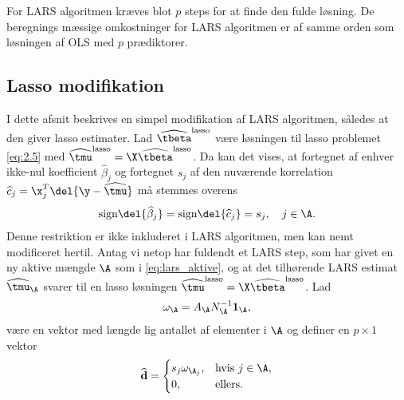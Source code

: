 For LARS algoritmen kræves blot \(p\) steps for at finde den fulde løsning.
De beregnings mæssige omkostninger for LARS algoritmen er af samme orden som løsningen af OLS med \(p\) prædiktorer.


\subsection{Lasso modifikation} \label{subsec:lasso_modifikation}
I dette afsnit beskrives en simpel modifikation af LARS algoritmen, således at den giver lasso estimater.
Lad \(\widehat{\tbeta}^\text{lasso}\) være løsningen til lasso problemet \eqref{eq:2.5} med \(\widehat{\tmu}^\text{lasso} = \X \widehat{\tbeta}^\text{lasso}\).
Da kan det vises, at fortegnet af enhver ikke-nul koefficient \(\widehat{\beta}_j\) og fortegnet \(s_j\) af den nuværende korrelation \(\widehat{c}_j = \x_j^T \del{\y - \widehat{\tmu}}\) må stemmes overens
\begin{align}
\text{sign} \del{\widehat{\beta}_j } = \text{sign} \del{\widehat{c}_j } = s_j, \quad j \in \A. \label{eq:lars_3.1}
\end{align}
%
%
Denne restriktion er ikke inkluderet i LARS algoritmen, men kan nemt modificeret hertil. 
Antag vi netop har fuldendt et LARS step, som har givet en ny aktive mængde \(\A\) som i \eqref{eq:lars_aktive}, og at det tilhørende LARS estimat \(\widehat{\tmu}_\A\) svarer til en lasso løsningen \(\widehat{\tmu}^\text{lasso} = \X \widehat{\tbeta}^\text{lasso}\).
Lad
\begin{align*}
\omega_\A = A_\A N_\A^{-1} \mathbf{1}_\A,
\end{align*}
være en vektor med længde lig antallet af elementer i \(\A\) og definer en \(p \times 1\) vektor
\begin{align*}
\widehat{\mathbf{d}} = \begin{cases}
s_j \omega_{\A_j}, &\text{hvis } j \in \A, \\
0, & \text{ellers}.
\end{cases}
\end{align*}

